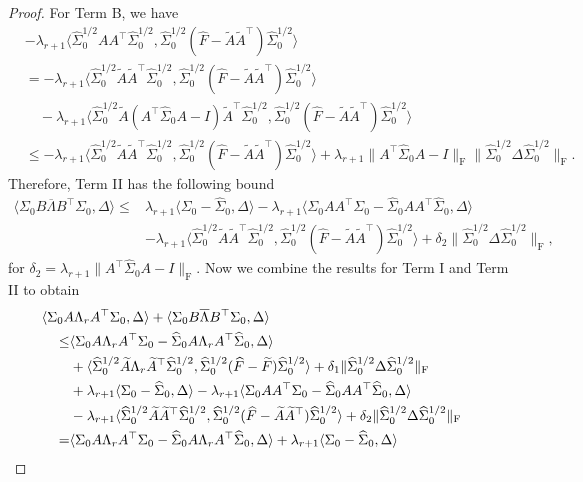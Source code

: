 \documentclass[11pt]{article}
\newcommand{\LambdaRest}{\overline{\Lambda}} %
\newcommand{\so}{\widehat{\Sigma}_0}
\newcommand{\0}{{\mathbf{0}}}
\newcommand{\tA}{{\widetilde{A}}}
\newcommand{\tF}{{\widetilde{F}}}
\begin{document}
\begin{proof}
For Term B, we have 
\begin{align*}
& -\lambda_{r+1}\langle\so^{1/2}AA^\top\so^{1/2},\so^{1/2}(\widehat{F}-\tA\tA^\top)\so^{1/2}\rangle \\
& = -\lambda_{r+1}\langle\so^{1/2}\tA\tA^\top\so^{1/2},\so^{1/2}(\widehat{F}-\tA\tA^\top)\so^{1/2}\rangle\\
&\quad -\lambda_{r+1}\langle \so^{1/2}\tA(A^\top\so A-I)\tA^\top\so^{1/2}, \so^{1/2}(\widehat{F}-\tA\tA^\top)\so^{1/2}\rangle\\
& \leq -\lambda_{r+1}\langle\so^{1/2}\tA\tA^\top\so^{1/2},\so^{1/2}(\widehat{F}-\tA\tA^\top)\so^{1/2}\rangle
+\lambda_{r+1}\|A^\top\so A-I\|_\mathrm{F}\|\so^{1/2}\Delta\so^{1/2}\|_\mathrm{F}.
\end{align*}
Therefore, Term II has the following bound\begin{align*}
\langle \Sigma_0B\LambdaRest B^\top\Sigma_0,\Delta\rangle \leq &\lambda_{r+1}\langle \Sigma_0-\widehat{\Sigma}_0,\Delta\rangle -\lambda_{r+1}\langle\Sigma_0AA^\top\Sigma_0-\widehat{\Sigma}_0AA^\top\so,\Delta \rangle \\
&-\lambda_{r+1}\langle\so^{1/2}\tA\tA^\top\so^{1/2},\so^{1/2}(\widehat{F}-\tA\tA^\top)\so^{1/2}\rangle+\delta_2\|\so^{1/2}\Delta\so^{1/2}\|_\mathrm{F},
\end{align*}
for $\delta_2 = \lambda_{r+1}\|A^\top\so A-I\|_\mathrm{F}$. 
Now we combine the results for Term I and Term II to obtain
\begin{align*}
& \hskip -2em \langle \Sigma_0A\Lambda_rA^\top\Sigma_0,\Delta\rangle+\langle \Sigma_0B\LambdaRest B^\top\Sigma_0,\Delta\rangle \\
\leq & \langle\Sigma_0A\Lambda_rA^\top\Sigma_0-\so A\Lambda_r A^\top\so,\Delta\rangle\\&+\langle \so^{1/2}\tA\Lambda_r \tA^\top\so^{1/2},\so^{1/2}(\widehat{F}-\tF)\so^{1/2} \rangle
+\delta_1\|\so^{1/2}\Delta\so^{1/2} \|_\mathrm{F}\\
&+\lambda_{r+1}\langle \Sigma_0-\widehat{\Sigma}_0,\Delta\rangle -\lambda_{r+1}\langle\Sigma_0AA^\top\Sigma_0-\widehat{\Sigma}_0AA^\top\so,\Delta \rangle \\
&-\lambda_{r+1}\langle\so^{1/2}\tA\tA^\top\so^{1/2},\so^{1/2}(\widehat{F}-\tA\tA^\top)\so^{1/2}\rangle+\delta_2\|\so^{1/2}\Delta\so^{1/2}\|_\mathrm{F}\\
=& \langle\Sigma_0A\Lambda_rA^\top\Sigma_0-\so A\Lambda_r A^\top\so,\Delta\rangle+\lambda_{r+1}\langle \Sigma_0-\widehat{\Sigma}_0,\Delta\rangle \\

\end{align*}
\end{proof}
\end{document}
